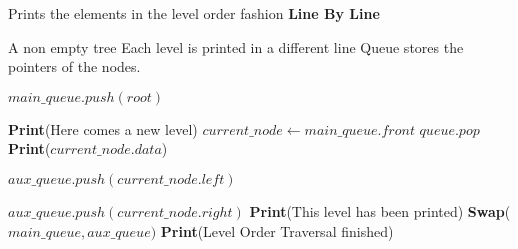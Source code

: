 \documentclass[12pt]{article}
\begin{document}
\begin{algorithm}

  \caption{Prints the elements in the level order fashion \textbf{Line By Line}}
  \begin{algorithmic}[1]
    \Require A non empty tree
    \Ensure Each level is printed in a different line 
    \Statex
        \LeftComment Queue stores the pointers of the nodes.
        
        \Statex
        \State $main\_queue.push(root)$
        
            \State \textbf{Print}(Here comes a new level)
                \State $current\_node\gets main\_queue.front $
                \State $queue.pop$
                \State \textbf{Print}($current\_node.data$)
                
                    \State $aux\_queue.push(current\_node.left)$
                \EndIf
                
                    \State $aux\_queue.push(current\_node.right)$
                \EndIf
            \EndWhile
            \State \textbf{Print}(This level has been printed)
            \State \textbf{Swap}($main\_queue, aux\_queue)$
        \EndWhile
        \Statex
        \State \textbf{Print}(Level Order Traversal finished)
    \EndFunction
  \end{algorithmic}
  
\end{algorithm}
\end{document}
